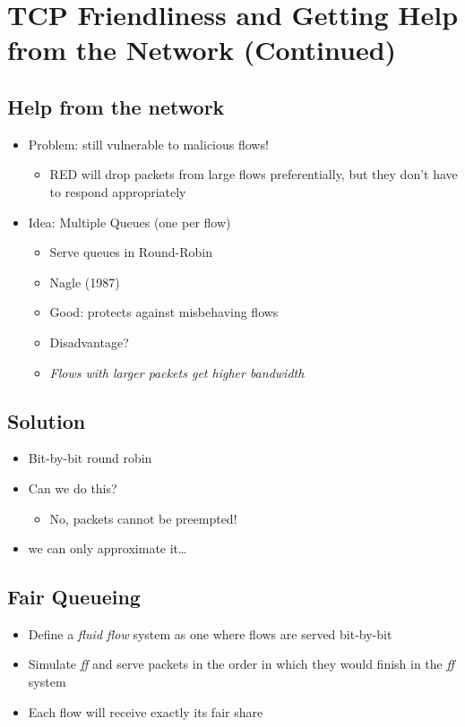 \section{TCP Friendliness and Getting Help from the Network (Continued)}
\subsection{Help from the network}
\begin{itemize}[nosep]
    \item Problem: still vulnerable to malicious flows!
          \begin{itemize}[nosep]
              \item RED will drop packets from large flows preferentially, but they don't have to respond appropriately
          \end{itemize}
    \item Idea: Multiple Queues (one per flow)
          \begin{itemize}[nosep]
              \item Serve queues in Round-Robin
              \item Nagle (1987)
              \item Good: protects against misbehaving flows
              \item Disadvantage?
              \item \emph{Flows with larger packets get higher bandwidth}
          \end{itemize}
\end{itemize}
\subsection{Solution}
\begin{itemize}[nosep]
    \item Bit-by-bit round robin
    \item Can we do this?
          \begin{itemize}[nosep]
              \item No, packets cannot be preempted!
          \end{itemize}
    \item we can only approximate it\dots
\end{itemize}
\subsection{Fair Queueing}
\begin{itemize}[nosep]
    \item Define a \emph{fluid flow} system as one where flows are served bit-by-bit
    \item Simulate \emph{ff} and serve packets in the order in which they would finish in the \emph{ff} system
    \item Each flow will receive exactly its fair share
\end{itemize}

